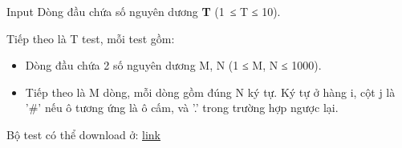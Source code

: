 Input
Dòng đầu chứa số nguyên dương   \textbf{    T   }   (1 ≤ T ≤ 10).  

   Tiếp theo là T test, mỗi test gồm:  
\begin{itemize}
	\item     Dòng đầu chứa 2 số nguyên dương M, N (1 ≤ M, N ≤ 1000).   
	\item     Tiếp theo là M dòng, mỗi dòng gồm đúng N ký tự. Ký tự ở hàng i, cột j là '\#' nếu ô tương ứng là ô cấm, và '.' trong trường hợp ngược lại.   
\end{itemize}

   Bộ test có thể download ở:   \href{../../../content/voj:VMTILE}{    link   }